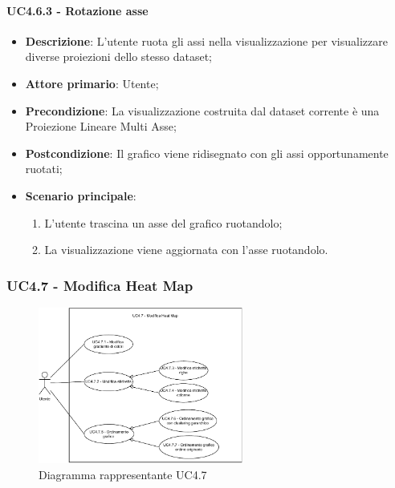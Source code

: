 \paragraph{UC4.6.3 - Rotazione asse}
\label{par:uc4.6.3}
\begin{itemize}
    \item \textbf{Descrizione}: L'utente ruota gli assi nella visualizzazione per visualizzare diverse proiezioni dello stesso dataset;
    \item \textbf{Attore primario}: Utente;
    \item \textbf{Precondizione}: La visualizzazione costruita dal dataset corrente è una Proiezione Lineare Multi Asse;
    \item \textbf{Postcondizione}: Il grafico viene ridisegnato con gli assi opportunamente ruotati;
    \item \textbf{Scenario principale}:
    \begin{enumerate}
        \item L'utente trascina un asse del grafico ruotandolo;
	    \item La visualizzazione viene aggiornata con l'asse ruotandolo.
    \end{enumerate}
\end{itemize}

\newpage

\subsubsection{UC4.7 - Modifica Heat Map}
\label{ssub:uc4.7}
\begin{figure}[h]
    \centering
    \includegraphics[width=0.6\textwidth]{componenti/casi-duso/diagrammi/UC4_7.pdf}
    \caption{Diagramma rappresentante UC4.7}
    \label{fig:UC4.7}
\end{figure}


